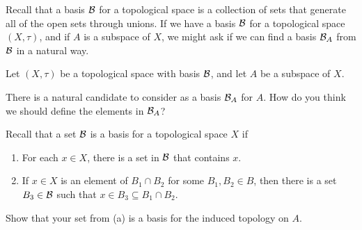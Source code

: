 
Recall that a basis $\mathcal{B}$ for a topological space is a collection of sets that generate all of the open sets through unions. If we have a basis $\mathcal{B}$ for a topological space $(X, \tau)$, and if $A$ is a subspace of $X$, we might ask if we can find a basis $\mathcal{B}_A$ from $\mathcal{B}$ in a natural way.

\begin{activity} Let $(X, \tau)$ be a topological space with basis $\mathcal{B}$, and let $A$ be a subspace of $X$.
\ba
\item There is a natural candidate to consider as a basis $\mathcal{B}_A$ for $A$. How do you think we should define the elements in $\mathcal{B}_A$?

\item Recall that a set $\mathcal{B}$ is a basis for a topological space $X$ if
\begin{enumerate}
\item For each $x \in X$, there is a set in $\mathcal{B}$ that contains $x$.
\item If $x \in X$ is an element of $B_1 \cap B_2$ for some $B_1, B_2 \in B$, then there is a set $B_3 \in \mathcal{B}$ such that $x \in B_3 \subseteq B_1 \cap B_2$. 
\end{enumerate}
Show that your set from (a) is a basis for the induced topology on $A$.

\ea

\end{activity}

\begin{comment}

\ActivitySolution

\ba
\item It is reasonable to define $\B_A$ as 
\[\B_A = \{B \cap A \mid B \in \B\}.\]

\item Let $a \in A$. Then $a \in X$ so there is a set $B \in \B$ such that $a \in B$. Then $a \in B \cap A$, so $\B_A$ satisfies the first condition of a basis. 

Now suppose $a \in A$ and that $a \in B_1 \cap B_2$ for some $B_1$ and $B_2$ in $\B_A$. By definition of $\B_A$, there are sets $C_1$ and $C_2$ in $\B$ such that $B_1 = A \cap C_1$ and $B_2 = A \cap C_2$. The fact that $\B$ is a basis for $X$ means that there is a set $C_3 \in \B$ such that $a \in C_3 \subseteq C_1 \cap C_2$.   Let $B_3 = A \cap C_3$. Then $a \in B_3$ and 
\[B_3 = A \cap C_3 \subseteq A \cap (C_1 \cap C_2) = (A \cap C_1) \cap (A \cap C_2) = B_1 \cap B_2.\]
It follows that $\B_A$ is a basis for the relative topology on $A$. 

\ea

\end{comment}
 

